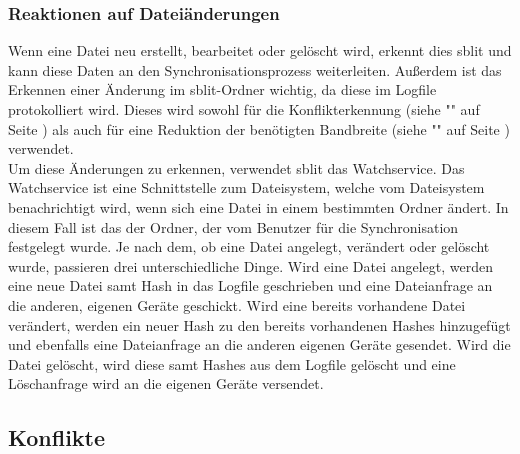 \subsubsection{Reaktionen auf Dateiänderungen}
Wenn eine Datei neu erstellt, bearbeitet oder gelöscht wird, erkennt dies sblit und kann diese Daten an den Synchronisationsprozess weiterleiten. Außerdem ist das Erkennen einer Änderung im sblit-Ordner wichtig, da diese im Logfile protokolliert wird. Dieses wird sowohl für die Konflikterkennung (siehe "" auf Seite \pageref{Konflikterkennung}) als auch für eine Reduktion der benötigten Bandbreite (siehe "" auf Seite \pageref{Dateianfragen}) verwendet.\\
Um diese Änderungen zu erkennen, verwendet sblit das Watchservice. Das Watchservice ist eine Schnittstelle zum Dateisystem, welche vom Dateisystem benachrichtigt wird, wenn sich eine Datei in einem bestimmten Ordner ändert. In diesem Fall ist das der Ordner, der vom Benutzer für die Synchronisation festgelegt wurde. Je nach dem, ob eine Datei angelegt, verändert oder gelöscht wurde, passieren drei unterschiedliche Dinge. Wird eine Datei angelegt, werden eine neue Datei samt Hash in das Logfile geschrieben und eine Dateianfrage an die anderen, eigenen Geräte geschickt. Wird eine bereits vorhandene Datei verändert, werden ein neuer Hash zu den bereits vorhandenen Hashes hinzugefügt und ebenfalls eine Dateianfrage an die anderen eigenen Geräte gesendet. Wird die Datei gelöscht, wird diese samt Hashes aus dem Logfile gelöscht und eine Löschanfrage wird an die eigenen Geräte versendet.
 
\subsection{Konflikte}\label{Konflikt}
